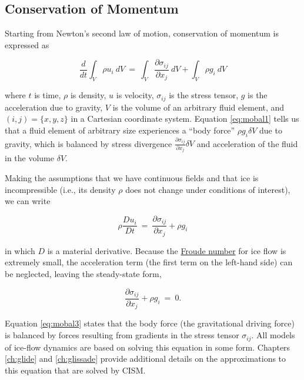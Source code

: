 \subsection{Conservation of Momentum}

Starting from Newton's second law of motion, conservation of momentum is expressed as

\begin{equation}
\frac{d} {dt} \int_{V}\rho u_{i}~dV ~ = ~ \int_{V} \frac{\partial \sigma_{ij}} {\partial x_{j}} ~dV +  \int_{V} \rho g_{i}~dV
\label{eq:mobal1}
\end{equation}

\noindent
where $t$ is time, $\rho$ is density, $u$ is
velocity, $\sigma_{ij}$ is the stress tensor, $g$ is the
acceleration due to gravity, $V$ is the volume of an arbitrary
fluid element, and $(i,j)= \{x, y, z\}$ in a Cartesian coordinate
system. Equation \eqref{eq:mobal1} tells us that a fluid element of arbitrary size 
experiences a ``body force'' $\rho g_{i}\delta V$ due to gravity, which is balanced by 
stress divergence $\frac{\partial \sigma_{ij}} {\partial x_{j}} \delta V$ and acceleration
of the fluid in the volume $\delta V$. 

Making the assumptions that we have continuous fields and that ice is incompressible (i.e., 
its density $\rho$ does not change under conditions of interest), we can write

\begin{equation}
\rho \frac{D u_{i}}{D t}~=~\frac{\partial \sigma_{ij}}{\partial x_{j}} + \rho g_{i}
\label{eq:mobal2}
\end{equation}

\noindent
in which $D$ is a material derivative. Because the \href{http://en.wikipedia.org/wiki/Froude_number}
{Froude number} for ice flow is extremely small, the acceleration term (the first term on the left-hand side) can be 
neglected, leaving the steady-state form, 

\begin{equation}
\frac{\partial \sigma_{ij}}{\partial x_{j}} + \rho g_{i} ~=~0.
\label{eq:mobal3}
\end{equation}

Equation \eqref{eq:mobal3} states that the body force (the gravitational driving force) is balanced by forces resulting from 
gradients in the stress tensor $\sigma_{ij}$. All models of ice-flow dynamics are based on solving this equation in some form.
Chapters \ref{ch:glide} and \ref{ch:glissade} provide additional details on the approximations to this equation that are
solved by CISM.

